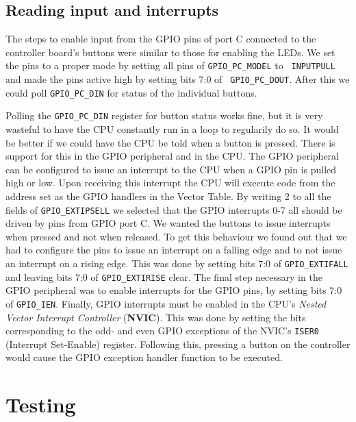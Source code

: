 \subsection{Reading input and interrupts}

The steps to enable input from the GPIO pins of port C connected to the
controller board's buttons were similar to those for enabling the LEDs. We set
the pins to a proper mode by setting all pins of {\tt GPIO\_PC\_MODEL} to {\tt
INPUTPULL} and made the pins active high by setting bits 7:0 of {\tt
GPIO\_PC\_DOUT}. After this we could poll {\tt GPIO\_PC\_DIN} for status of the
individual buttons.

Polling the {\tt GPIO\_PC\_DIN} register for button status works fine, but it is
very wasteful to have the CPU constantly run in a loop to regularily do so. It
would be better if we could have the CPU be told when a button is pressed. There
is support for this in the GPIO peripheral and in the CPU. The GPIO peripheral
can be configured to issue an interrupt to the CPU when a GPIO pin is pulled
high or low. Upon receiving this interrupt the CPU will execute code from the
address set as the GPIO handlers in the Vector Table. By writing 2 to all the
fields of {\tt GPIO\_EXTIPSELL} we selected that the GPIO interrupts 0-7 all
should be driven by pins from GPIO port C. We wanted the buttons to issue
interrupts when pressed and not when released. To get this behaviour we found
out that we had to configure the pins to issue an interrupt on a falling edge
and to not issue an interrupt on a rising edge. This was done by setting bits
7:0 of {\tt GPIO\_EXTIFALL} and leaving bits 7:0 of {\tt GPIO\_EXTIRISE} clear.
The final step necessary in the GPIO peripheral was to enable interrupts for the
GPIO pins, by setting bits 7:0 of {\tt GPIO\_IEN}. Finally, GPIO interrupts must
be enabled in the CPU's \emph{Nested Vector Interrupt Controller}
(\textbf{NVIC}). This was done by setting the bits corresponding to the odd- and
even GPIO exceptions of the NVIC's {\tt ISER0} (Interrupt Set-Enable) register.
Following this, pressing a button on the controller would cause the GPIO
exception handler function to be executed.

\section{Testing}
